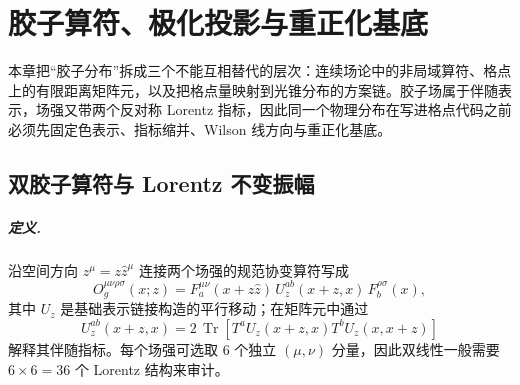 \chapter{胶子算符、极化投影与重正化基底}
\label{sec:b05-gluon-operators}

本章把“胶子分布”拆成三个不能互相替代的层次：连续场论中的非局域算符、格点上的有限距离矩阵元，以及把格点量映射到光锥分布的方案链。胶子场属于伴随表示，场强又带两个反对称 Lorentz 指标，因此同一个物理分布在写进格点代码之前必须先固定色表示、指标缩并、Wilson 线方向与重正化基底。

\section{双胶子算符与 Lorentz 不变振幅}

\paragraph{定义.}
沿空间方向 \(z^\mu=z\hat z^\mu\) 连接两个场强的规范协变算符写成
\begin{equation}
  O_g^{\mu\nu\rho\sigma}(x;z)
  =F_a^{\mu\nu}(x+z\hat z)\,
   U_z^{ab}(x+z,x)\,
   F_b^{\rho\sigma}(x),
  \label{eq:b05-gluon-operator}
\end{equation}
其中 \(U_z\) 是基础表示链接构造的平行移动；在矩阵元中通过
\begin{equation}
  U_z^{ab}(x+z,x)
  =2\,\operatorname{Tr}\!\left[T^aU_z(x+z,x)T^bU_z(x,x+z)\right]
  \label{eq:b05-adjoint-link}
\end{equation}
解释其伴随指标。每个场强可选取 \(6\) 个独立 \(( \mu,\nu)\) 分量，因此双线性一般需要 \(6\times6=36\) 个 Lorentz 结构来审计。

